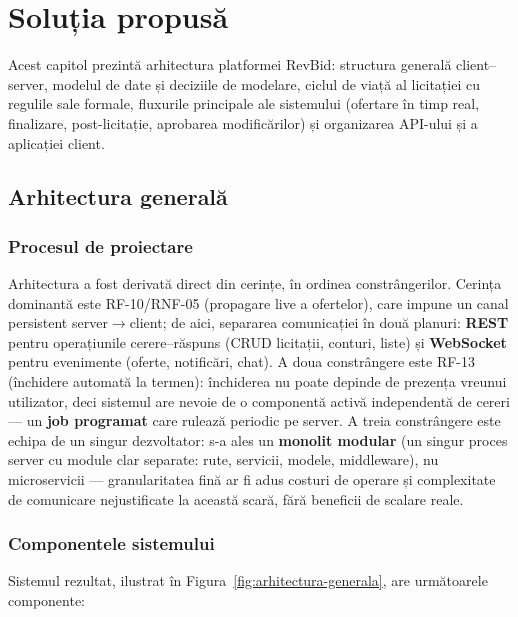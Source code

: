 \chapter{Soluția propusă}
\label{chap:solutia}

Acest capitol prezintă arhitectura platformei RevBid: structura generală client--server, modelul de date și deciziile de modelare, ciclul de viață al licitației cu regulile sale formale, fluxurile principale ale sistemului (ofertare în timp real, finalizare, post-licitație, aprobarea modificărilor) și organizarea API-ului și a aplicației client.

\section{Arhitectura generală}

\subsection{Procesul de proiectare}

Arhitectura a fost derivată direct din cerințe, în ordinea constrângerilor. Cerința dominantă este RF-10/RNF-05 (propagare live a ofertelor), care impune un canal persistent server$\to$client; de aici, separarea comunicației în două planuri: \textbf{REST} pentru operațiunile cerere--răspuns (CRUD licitații, conturi, liste) și \textbf{WebSocket} pentru evenimente (oferte, notificări, chat). A doua constrângere este RF-13 (închidere automată la termen): închiderea nu poate depinde de prezența vreunui utilizator, deci sistemul are nevoie de o componentă activă independentă de cereri --- un \textbf{job programat} care rulează periodic pe server. A treia constrângere este echipa de un singur dezvoltator: s-a ales un \textbf{monolit modular} (un singur proces server cu module clar separate: rute, servicii, modele, middleware), nu microservicii --- granularitatea fină ar fi adus costuri de operare și complexitate de comunicare nejustificate la această scară, fără beneficii de scalare reale.

\subsection{Componentele sistemului}

Sistemul rezultat, ilustrat în Figura~\ref{fig:arhitectura-generala}, are următoarele componente:

